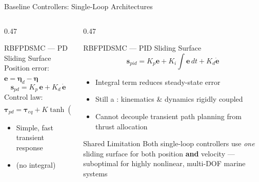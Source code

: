 \documentclass[aspectratio=169,10pt]{beamer}
\begin{document}
\begin{frame}{Baseline Controllers: Single-Loop Architectures}

\begin{columns}[T]
\begin{column}{0.47\textwidth}
  \begin{block}{RBFPDSMC — PD Sliding Surface}
    Position error: $\mathbf{e} = \bm{\eta}_d - \bm{\eta}$
    \[
      \mathbf{s}_{pd} = K_p\,\mathbf{e} + K_d\,\dot{\mathbf{e}}
    \]
    Control law:
    \[
      \bm{\tau}_{pd} = \bm{\tau}_{eq} + K\tanh(\mathbf{s}_{pd}) + \hat{\mathbf{W}}^\top\mathbf{h}(\mathbf{v})
    \]
    \begin{itemize}\small
      \item Simple, fast transient response
      \item {} (no integral)
    \end{itemize}
  \end{block}
\end{column}
\begin{column}{0.47\textwidth}
  \begin{block}{RBFPIDSMC — PID Sliding Surface}
    \[
      \mathbf{s}_{pid} = K_p\mathbf{e} + K_i\!\int\!\mathbf{e}\,dt + K_d\dot{\mathbf{e}}
    \]
    \begin{itemize}\small
      \item Integral term reduces steady-state error
      \item Still a : kinematics \& dynamics rigidly coupled
      \item Cannot decouple transient path planning from thrust allocation
    \end{itemize}
  \end{block}
  \vspace{6pt}
  \begin{alertblock}{Shared Limitation}
    \small Both single-loop controllers use \emph{one} sliding surface
    for both position \textbf{and} velocity — suboptimal for
    highly nonlinear, multi-DOF marine systems
  \end{alertblock}
\end{column}
\end{columns}
\end{frame}
\end{document}
